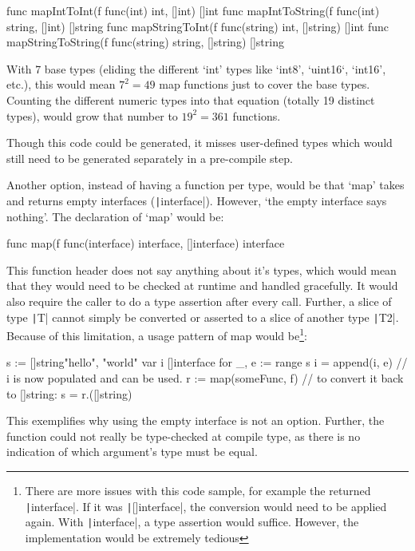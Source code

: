 \begin{gocode}
func mapIntToInt(f func(int) int, []int) []int
func mapIntToString(f func(int) string, []int) []string
func mapStringToInt(f func(string) int, []string) []int
func mapStringToString(f func(string) string, []string) []string
\end{gocode}

With 7 base types (eliding the different `int' types like `int8', `uint16`, `int16', etc.), this would
mean $7^{2} = 49$ map functions just to cover the base types. Counting the different numeric
types into that equation (totally 19 distinct types\autocite{go-basetypes}), would grow that number to $19^{2} = 361$ functions.

Though this code could be generated, it misses user-defined types which would still
need to be generated separately in a pre-compile step.

Another option, instead of having a function per type, would be that `map' takes and returns empty interfaces
(\texttt|interface{}|). However, `the empty interface says
nothing'\autocite{empty-interface}. The declaration of `map' would be:
\begin{gocode}
	func map(f func(interface{}) interface{}, []interface{}) interface{}
\end{gocode}

This function header does not say anything about it's types, which would
mean that they would need to be checked at runtime and handled gracefully. It
would also require the caller to do a type assertion after every call. Further,
a slice of type \texttt|T| cannot simply be converted or asserted to a slice of another type
\texttt|T2|\autocite{go-interface-slice-conv}\autocite{go-interface-slice-conv2}.
Because of this limitation, a usage pattern of map would be\footnote{There are more
	issues with this code sample, for example the returned \texttt|interface{}|. If
	it was \texttt|[]interface{}|, the conversion would need to be applied again. With
	\texttt|interface{}|, a type assertion would suffice. However, the implementation
would be extremely tedious}:
\begin{gocode}
s := []string{"hello", "world"}
var i []interface{}
for _, e := range s {
	i = append(i, e)
}
// i is now populated and can be used.
r := map(someFunc, f)
// to convert it back to []string:
s = r.([]string)
\end{gocode}

This exemplifies why using the empty interface is not an option. Further, the
function could not really be type-checked at compile type, as there is no indication
of which argument's type must be equal.

